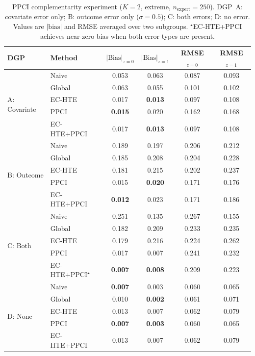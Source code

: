 \begin{table}[t]
\centering
\caption{PPCI complementarity experiment ($K{=}2$, extreme, $n_{\text{expert}}{=}250$). DGP~A: covariate error only; B: outcome error only ($\sigma{=}0.5$); C: both errors; D: no error. Values are $|\text{bias}|$ and RMSE averaged over two subgroups. $^\star$EC-HTE+PPCI achieves near-zero bias when both error types are present.}
\label{tab:ppci}
\small
\begin{tabular}{ll cccc}
\toprule
DGP & Method & $|\text{Bias}|_{z=0}$ & $|\text{Bias}|_{z=1}$ & RMSE$_{z=0}$ & RMSE$_{z=1}$ \\
\midrule
\multirow{5}{*}{A: Covariate}
 & Naive & 0.053 & 0.063 & 0.087 & 0.093 \\
 & Global & 0.063 & 0.055 & 0.101 & 0.102 \\
 & EC-HTE & 0.017 & \textbf{0.013} & 0.097 & 0.108 \\
 & PPCI & \textbf{0.015} & 0.020 & 0.162 & 0.168 \\
 & EC-HTE+PPCI & 0.017 & \textbf{0.013} & 0.097 & 0.108 \\
\midrule
\multirow{5}{*}{B: Outcome}
 & Naive & 0.189 & 0.197 & 0.206 & 0.212 \\
 & Global & 0.185 & 0.208 & 0.204 & 0.228 \\
 & EC-HTE & 0.181 & 0.215 & 0.202 & 0.237 \\
 & PPCI & 0.015 & \textbf{0.020} & 0.171 & 0.176 \\
 & EC-HTE+PPCI & \textbf{0.012} & 0.023 & 0.171 & 0.186 \\
\midrule
\multirow{5}{*}{C: Both}
 & Naive & 0.251 & 0.135 & 0.267 & 0.155 \\
 & Global & 0.182 & 0.209 & 0.233 & 0.235 \\
 & EC-HTE & 0.179 & 0.216 & 0.224 & 0.262 \\
 & PPCI & 0.017 & 0.007 & 0.241 & 0.232 \\
 & EC-HTE+PPCI$^\star$ & \textbf{0.007} & \textbf{0.008} & 0.209 & 0.223 \\
\midrule
\multirow{5}{*}{D: None}
 & Naive & \textbf{0.007} & 0.003 & 0.060 & 0.065 \\
 & Global & 0.010 & \textbf{0.002} & 0.061 & 0.071 \\
 & EC-HTE & 0.013 & 0.007 & 0.062 & 0.079 \\
 & PPCI & \textbf{0.007} & \textbf{0.003} & 0.060 & 0.065 \\
 & EC-HTE+PPCI & 0.013 & 0.007 & 0.062 & 0.079 \\
\bottomrule
\end{tabular}
\end{table}

